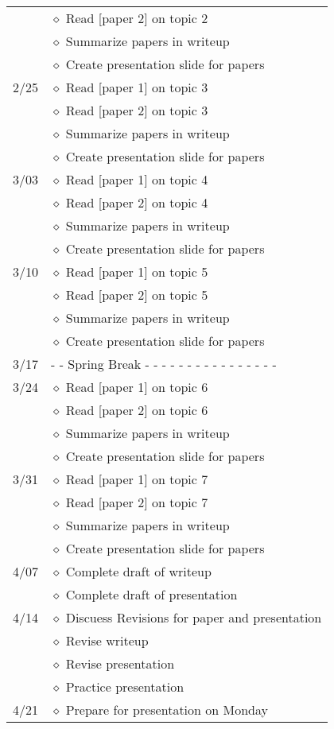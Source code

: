 \documentclass[12pt]{article}
\begin{document}
\begin{table}[ht]
\begin{tabular}{m{0.5in} m{5.5in}}
         & $\diamond$ Read [paper 2] on topic 2\\
         & $\diamond$ Summarize papers in writeup\\
         & $\diamond$ Create presentation slide for papers\\
    \hline
    2/25 & $\diamond$ Read [paper 1] on topic 3\\
         & $\diamond$ Read [paper 2] on topic 3\\
         & $\diamond$ Summarize papers in writeup\\
         & $\diamond$ Create presentation slide for papers\\
    \hline
    3/03 & $\diamond$ Read [paper 1] on topic 4\\
         & $\diamond$ Read [paper 2] on topic 4\\
         & $\diamond$ Summarize papers in writeup\\
         & $\diamond$ Create presentation slide for papers\\
    \hline
    3/10 & $\diamond$ Read [paper 1] on topic 5\\
         & $\diamond$ Read [paper 2] on topic 5\\
         & $\diamond$ Summarize papers in writeup\\
         & $\diamond$ Create presentation slide for papers\\
    \hline
    3/17 & - - Spring Break - - - - - - - - - - - - - - - -\\
    \hline
    3/24 & $\diamond$ Read [paper 1] on topic 6\\
         & $\diamond$ Read [paper 2] on topic 6\\
         & $\diamond$ Summarize papers in writeup\\
         & $\diamond$ Create presentation slide for papers\\
    \hline
    3/31 & $\diamond$ Read [paper 1] on topic 7\\
         & $\diamond$ Read [paper 2] on topic 7\\
         & $\diamond$ Summarize papers in writeup\\
         & $\diamond$ Create presentation slide for papers\\
    \hline
    4/07 & $\diamond$ Complete draft of writeup\\
         & $\diamond$ Complete draft of presentation\\
    \hline
    4/14 & $\diamond$ Discuess Revisions for paper and presentation\\
         & $\diamond$ Revise writeup\\
         & $\diamond$ Revise presentation\\
         & $\diamond$ Practice presentation\\
    \hline
    4/21 & $\diamond$ Prepare for presentation on Monday\\
    \hline
    \end{tabular}
    \label{schedule}
\end{table}
\end{document}
